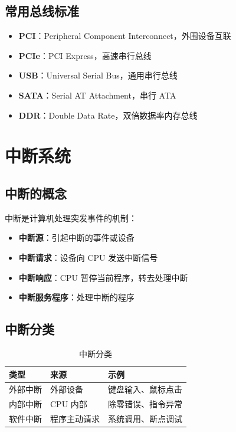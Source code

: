 \documentclass[12pt,UTF8]{ctexbook}
\begin{document}
\section{常用总线标准}

\begin{itemize}[leftmargin=2cm]
    \item \textbf{PCI}：Peripheral Component Interconnect，外围设备互联
    \item \textbf{PCIe}：PCI Express，高速串行总线
    \item \textbf{USB}：Universal Serial Bus，通用串行总线
    \item \textbf{SATA}：Serial AT Attachment，串行 ATA
    \item \textbf{DDR}：Double Data Rate，双倍数据率内存总线
\end{itemize}

\chapter{中断系统}
\label{chap:interrupt}

\section{中断的概念}

中断是计算机处理突发事件的机制：

\begin{itemize}[leftmargin=2cm]
    \item \textbf{中断源}：引起中断的事件或设备
    \item \textbf{中断请求}：设备向 CPU 发送中断信号
    \item \textbf{中断响应}：CPU 暂停当前程序，转去处理中断
    \item \textbf{中断服务程序}：处理中断的程序
\end{itemize}

\section{中断分类}

\begin{table}[htbp]
    \centering
    \caption{中断分类}
    \begin{tabular}{|p{3cm}|p{3cm}|p{4cm}|}
        \hline
        \textbf{类型} & \textbf{来源} & \textbf{示例} \\
        \hline
        外部中断 & 外部设备 & 键盘输入、鼠标点击 \\
        \hline
        内部中断 & CPU 内部 & 除零错误、指令异常 \\
        \hline
        软件中断 & 程序主动请求 & 系统调用、断点调试 \\
        \hline
    \end{tabular}
\end{table}
\end{document}
